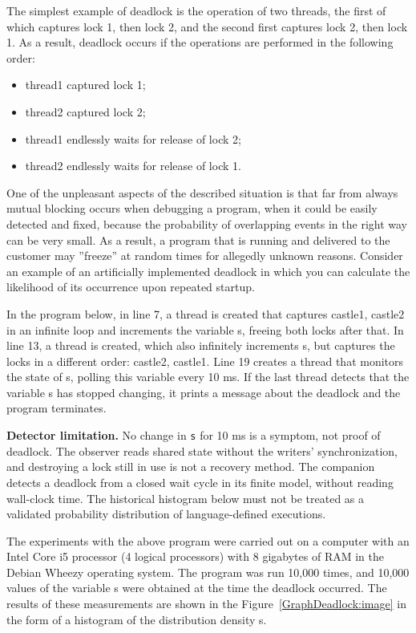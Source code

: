 {	\par The simplest example of deadlock is the operation of two threads, the first of which captures lock 1, then lock 2, and the second first captures lock 2, then lock 1. As a result, deadlock occurs if the operations are performed in the following order:
	\begin{itemize}
\item thread1 captured lock 1;
\item thread2 captured lock 2;
\item thread1 endlessly waits for release of lock 2;
\item thread2 endlessly waits for release of lock 1.
	\end{itemize}
	\par One of the unpleasant aspects of the described situation is that far from always mutual blocking occurs when debugging a program, when it could be easily detected and fixed, because the probability of overlapping events in the right way can be very small. As a result, a program that is running and delivered to the customer may ''freeze'' at random times for allegedly unknown reasons. Consider an example of an artificially implemented deadlock in which you can calculate the likelihood of its occurrence upon repeated startup.
	\par In the program below, in line 7, a thread is created that captures castle1, castle2 in an infinite loop and increments the variable s, freeing both locks after that. In line 13, a thread is created, which also infinitely increments s, but captures the locks in a different order: castle2, castle1. Line 19 creates a thread that monitors the state of s, polling this variable every 10 ms. If the last thread detects that the variable s has stopped changing, it prints a message about the deadlock and the program terminates.
	\begin{figure}[H]
		
	\end{figure}
	\par\textbf{Detector limitation.} No change in \texttt{s} for 10 ms is a symptom, not proof of deadlock. The observer reads shared state without the writers' synchronization, and destroying a lock still in use is not a recovery method. The companion detects a deadlock from a closed wait cycle in its finite model, without reading wall-clock time. The historical histogram below must not be treated as a validated probability distribution of language-defined executions.
	\par The experiments with the above program were carried out on a computer with an Intel Core i5 processor (4 logical processors) with 8 gigabytes of RAM in the Debian Wheezy operating system. The program was run 10,000 times, and 10,000 values of the variable s were obtained at the time the deadlock occurred. The results of these measurements are shown in the Figure~\ref{GraphDeadlock:image} in the form of a histogram of the distribution density s.
}
